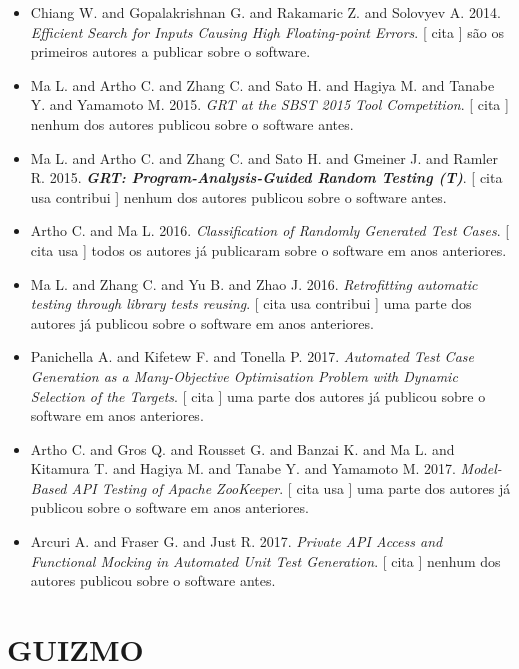 \begin{itemize}
\item Chiang W. and Gopalakrishnan G. and Rakamaric Z. and Solovyev A.
      2014.
        \textit{ Efficient Search for Inputs Causing High Floating-point Errors}.
      [
          cita
      ]
são os primeiros autores a publicar sobre o software.
\item Ma L. and Artho C. and Zhang C. and Sato H. and Hagiya M. and Tanabe Y. and Yamamoto M.
      2015.
        \textit{ GRT at the SBST 2015 Tool Competition}.
      [
          cita
      ]
nenhum dos autores publicou sobre o software antes.
\item Ma L. and Artho C. and Zhang C. and Sato H. and Gmeiner J. and Ramler R.
      2015.
        \textbf{\textit{ GRT: Program-Analysis-Guided Random Testing (T)}}.
      [
          cita
          usa
          contribui
      ]
nenhum dos autores publicou sobre o software antes.
\item Artho C. and Ma L.
      2016.
        \textit{ Classification of Randomly Generated Test Cases}.
      [
          cita
          usa
      ]
todos os autores já publicaram sobre o software em anos anteriores.
\item Ma L. and Zhang C. and Yu B. and Zhao J.
      2016.
        \textit{ Retrofitting automatic testing through library tests reusing}.
      [
          cita
          usa
          contribui
      ]
uma parte dos autores já publicou sobre o software em anos anteriores.
\item Panichella A. and Kifetew F. and Tonella P.
      2017.
        \textit{ Automated Test Case Generation as a Many-Objective Optimisation Problem with Dynamic Selection of the Targets}.
      [
          cita
      ]
uma parte dos autores já publicou sobre o software em anos anteriores.
\item Artho C. and Gros Q. and Rousset G. and Banzai K. and Ma L. and Kitamura T. and Hagiya M. and Tanabe Y. and Yamamoto M.
      2017.
        \textit{ Model-Based API Testing of Apache ZooKeeper}.
      [
          cita
          usa
      ]
uma parte dos autores já publicou sobre o software em anos anteriores.
\item Arcuri A. and Fraser G. and Just R.
      2017.
        \textit{ Private API Access and Functional Mocking in Automated Unit Test Generation}.
      [
          cita
      ]
nenhum dos autores publicou sobre o software antes.
\end{itemize}
\section{GUIZMO}

